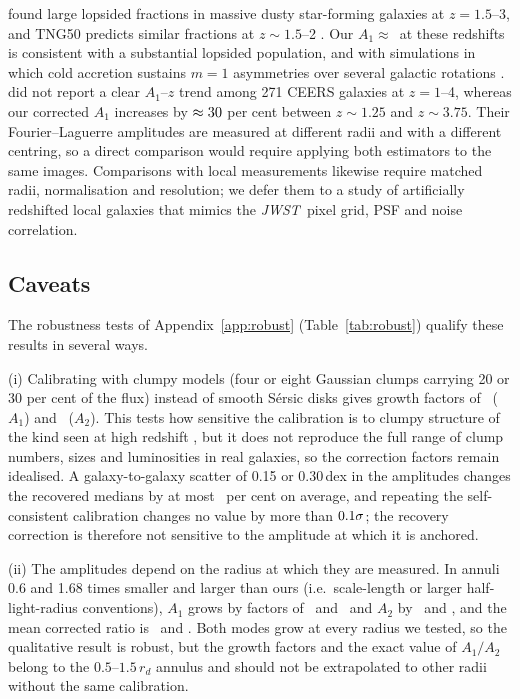 \documentclass[fleqn,usenatbib]{mnras}
\newcommand{\JWST}{\textit{JWST}}
\begin{document}
\citet{LeBail2024} found large lopsided fractions in massive dusty
star-forming galaxies at $z=1.5$--3, and TNG50 predicts similar fractions at
$z\sim1.5$--2 \citep{Jimenez2025}. Our $A_1\approx{}$\numAOneMidRange\ at these
redshifts is consistent with a substantial lopsided population, and with
simulations in which cold accretion sustains $m=1$ asymmetries over several
galactic rotations \citep{Dekel2009,Dekel2020}. \citet{Ganapathy2024} did not
report a clear $A_1$--$z$ trend among 271 CEERS galaxies at $z=1$--4, whereas our
corrected $A_1$ increases by $\approx30$ per cent between $z\sim1.25$
and $z\sim3.75$. Their Fourier--Laguerre amplitudes are measured at different
radii and with a different centring, so a direct comparison would require
applying both estimators to the same images. Comparisons with local measurements
likewise require matched radii, normalisation and resolution; we defer them to a
study of artificially redshifted local galaxies \citep[e.g.][]{Barden2008} that
mimics the \JWST\ pixel grid, PSF and noise correlation.

\subsection{Caveats}\label{sec:caveats}

The robustness tests of Appendix~\ref{app:robust} (Table~\ref{tab:robust})
qualify these results in several ways.

(i) Calibrating with clumpy models (four or eight Gaussian clumps carrying 20
or 30 per cent of the flux) instead of smooth S\'ersic disks gives growth factors
of \numClumpOne\ ($A_1$) and \numClumpTwo\ ($A_2$). This tests how sensitive the
calibration is to clumpy structure of the kind seen at high redshift
\citep{Ferreira2022,Kartaltepe2023}, but it does not reproduce the full range of
clump numbers, sizes and luminosities in real galaxies, so the correction factors
remain idealised. A galaxy-to-galaxy scatter of 0.15 or 0.30\,dex in the
amplitudes changes the recovered medians by at most \numSpreadMax\ per cent on
average, and repeating the self-consistent calibration changes no value by more
than $0.1\sigma$; the recovery correction is therefore not sensitive to
the amplitude at which it is anchored.

(ii) The amplitudes depend on the radius at which they are measured. In annuli
0.6 and 1.68 times smaller and larger than ours (i.e.\ scale-length or larger
half-light-radius conventions), $A_1$ grows by factors of \numAnnSmallOne\ and
\numAnnLargeOne\ and $A_2$ by \numAnnSmallTwo\ and \numAnnLargeTwo, and the mean
corrected ratio is \numAnnSmallR\ and \numAnnLargeR. Both modes grow at every
radius we tested, so the qualitative result is robust, but the growth factors and
the exact value of $A_1/A_2$ belong to the $0.5$--$1.5\,r_d$ annulus and should
not be extrapolated to other radii without the same calibration.
\end{document}
